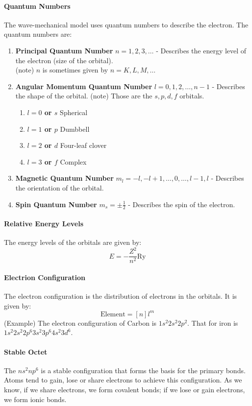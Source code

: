 \documentclass[11pt]{article}
\begin{document}
\paragraph{Quantum Numbers} The wave-mechanical model uses quantum numbers to describe the electron. The quantum numbers are:   
\begin{enumerate}
    \item \textbf{Principal Quantum Number} $n = 1,2,3,\dots$ - Describes the energy level of the electron (size of the orbital). \\
    (note) $n$ is sometimes given by $n = K, L, M, \dots$
    \item \textbf{Angular Momentum Quantum Number} $l = 0,1,2,\dots,n-1$ - Describes the shape of the orbital.
    (note) Those are the $s,p,d,f$ orbitals.
    \begin{enumerate}
        \item \textbf{$l=0$ or $s$} Spherical
        \item \textbf{$l=1$ or $p$} Dumbbell
        \item \textbf{$l=2$ or $d$} Four-leaf clover
        \item \textbf{$l=3$ or $f$} Complex
    \end{enumerate}
    \item \textbf{Magnetic Quantum Number} $m_l = -l, -l+1, \dots, 0, \dots, l-1, l$ - Describes the orientation of the orbital.
    \item \textbf{Spin Quantum Number} $m_s = \pm \frac{1}{2}$ - Describes the spin of the electron.
\end{enumerate}
\paragraph{Relative Energy Levels} The energy levels of the orbitals are given by:
\begin{equation}
    E = -\frac{Z^2}{n^2} \text{Ry}
\end{equation}
\paragraph{Electrion Configuration} The electron configuration is the distribution of electrons in the orbitals. It is given by:
\begin{equation}
    \text{Element} = [n]l^m
\end{equation}
(Example) The electron configuration of Carbon is $1s^2 2s^2 2p^2$. That for iron is $1s^2 2s^2 2p^6 3s^2 3p^6 4s^2 3d^6$.
\paragraph{Stable Octet} The $ns^2 np^6$ is a stable configuration that forms the basis for the primary bonds. Atoms tend to gain, lose or share electrons to achieve this configuration. As we know, if we share electrons, we form covalent bonds; if we lose or gain electrons, we form ionic bonds.
\end{document}
